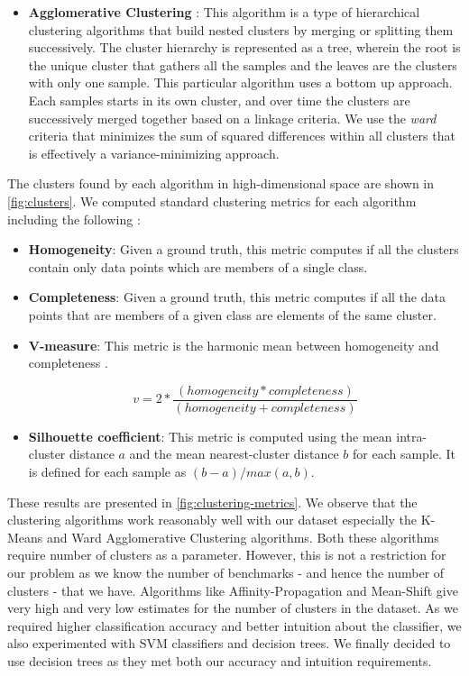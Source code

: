 \begin{itemize}
\item \textbf{Agglomerative Clustering} :
This algorithm is a type of hierarchical clustering algorithms that build nested clusters 
by merging or splitting them successively. 
The cluster hierarchy is represented as a tree, wherein the root is the unique
cluster that gathers all the samples and the leaves are the clusters with only
one sample. 
This particular algorithm uses a bottom up approach. Each samples starts in
its own cluster, and over time the clusters are successively merged together
based on a linkage criteria.
We use the \textit{ward} criteria that minimizes the sum of squared differences 
within all clusters that is effectively a variance-minimizing approach.
\end{itemize}

The clusters found by each algorithm in high-dimensional space are shown in
\cref{fig:clusters}.
We computed standard clustering metrics for each algorithm including the
following :

\begin{itemize}
  \item \textbf{Homogeneity}:
	Given a ground truth, this metric computes if all the clusters contain only
	data points which are members of a single class.
  \item \textbf{Completeness}: 
	Given a ground truth, this metric computes if all the data points that are
	members of a given class are elements of the same cluster.
  \item \textbf{V-measure}: 
	This metric is the harmonic mean between homogeneity and completeness
	\citep{v-measure}.

	$$v = 2 * \frac{(homogeneity * completeness)}{(homogeneity + completeness)}$$

  \item \textbf{Silhouette coefficient}: 
  This metric is computed using the mean intra-cluster distance
  $a$ and the mean nearest-cluster distance $b$ for each sample.
  It is defined for each sample as $(b-a)/max(a, b)$.
\end{itemize}

These results are presented in \cref{fig:clustering-metrics}. We observe that
the clustering algorithms work reasonably well with our dataset
especially the K-Means and Ward Agglomerative Clustering algorithms. 
Both these algorithms require number of clusters as a parameter. 
However, this is not a restriction for our problem as we know the number of
benchmarks - and hence the number of clusters - that we have.
Algorithms like Affinity-Propagation and Mean-Shift give very high and 
very low estimates for the number of clusters in the dataset.
As we required higher classification accuracy and better intuition about
the classifier, we also experimented with SVM classifiers and decision trees. 
We finally decided to use decision trees as they met both our accuracy
and intuition requirements.

